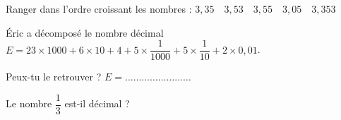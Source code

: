 \begin{pageParcourst}

Ranger dans l'ordre croissant les nombres : $3,35 \quad 3,53 \quad 3,55 \quad 3,05 \quad 3,353$
 



Éric a décomposé le nombre décimal  $E = 23\times 1000 + 6\times 10 + 4 +  5\times \dfrac{1}{1000} + 5\times \dfrac{1}{10} +  2\times 0,01 $. 

Peux-tu le retrouver ? $E = \ldots\ldots\ldots\ldots\ldots\ldots\ldots\ldots $


Le nombre $\dfrac{1}{3}$ est-il décimal ?
 

\end{pageParcourst}



